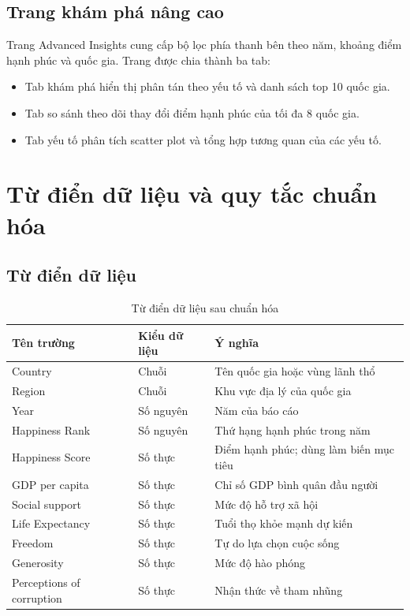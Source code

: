 \subsection{Trang khám phá nâng cao}

Trang Advanced Insights cung cấp bộ lọc phía thanh bên theo năm, khoảng điểm hạnh phúc và quốc gia. Trang được chia thành ba tab:

\begin{itemize}
    \item Tab khám phá hiển thị phân tán theo yếu tố và danh sách top 10 quốc gia.
    \item Tab so sánh theo dõi thay đổi điểm hạnh phúc của tối đa 8 quốc gia.
    \item Tab yếu tố phân tích scatter plot và tổng hợp tương quan của các yếu tố.
\end{itemize}

\section{Từ điển dữ liệu và quy tắc chuẩn hóa}

\subsection{Từ điển dữ liệu}

\begin{table}[H]
\centering
\begin{tabular}{|p{4.2cm}|p{2.4cm}|p{5.8cm}|}
\hline
\textbf{Tên trường} & \textbf{Kiểu dữ liệu} & \textbf{Ý nghĩa} \\
\hline
Country & Chuỗi & Tên quốc gia hoặc vùng lãnh thổ \\
\hline
Region & Chuỗi & Khu vực địa lý của quốc gia \\
\hline
Year & Số nguyên & Năm của báo cáo \\
\hline
Happiness Rank & Số nguyên & Thứ hạng hạnh phúc trong năm \\
\hline
Happiness Score & Số thực & Điểm hạnh phúc; dùng làm biến mục tiêu \\
\hline
GDP per capita & Số thực & Chỉ số GDP bình quân đầu người \\
\hline
Social support & Số thực & Mức độ hỗ trợ xã hội \\
\hline
Life Expectancy & Số thực & Tuổi thọ khỏe mạnh dự kiến \\
\hline
Freedom & Số thực & Tự do lựa chọn cuộc sống \\
\hline
Generosity & Số thực & Mức độ hào phóng \\
\hline
Perceptions of corruption & Số thực & Nhận thức về tham nhũng \\
\hline
\end{tabular}
\caption{Từ điển dữ liệu sau chuẩn hóa}
\label{tab:tu-dien-du-lieu}
\end{table}


